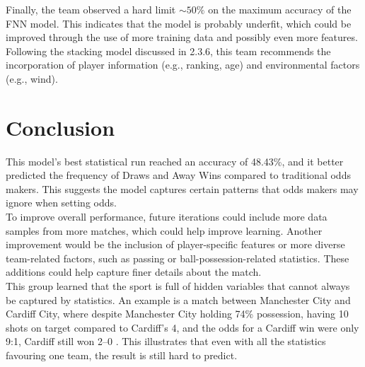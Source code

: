 \documentclass[rgb,listoffigures,listoftables,final]{cam-thesis}
\begin{document}
    Finally, the team observed a hard limit $\sim 50\%$ on the maximum accuracy of the FNN model. This indicates that the model is probably underfit, which could be improved through the use of more training data and possibly even more features. Following the stacking model discussed in 2.3.6, this team recommends the incorporation of player information (e.g., ranking, age) and environmental factors (e.g., wind).

\chapter{Conclusion}
    This model's best statistical run reached an accuracy of 48.43\%, and it better predicted the frequency of Draws and Away Wins compared to traditional odds makers. This suggests the model captures certain patterns that odds makers may ignore when setting odds.\\
    
    To improve overall performance, future iterations could include more data samples from more matches, which could help improve learning. Another improvement would be the inclusion of player-specific features or more diverse team-related factors, such as passing or ball-possession-related statistics. These additions could help capture finer details about the match.\\
    
    This group learned that the sport is full of hidden variables that cannot always be captured by statistics. An example is a match between Manchester City and Cardiff City, where despite Manchester City holding 74\% possession, having 10 shots on target compared to Cardiff’s 4, and the odds for a Cardiff win were only 9:1, Cardiff still won 2–0 \cite{socceranalytics}. This illustrates that even with all the statistics favouring one team, the result is still hard to predict. 



\end{document}
